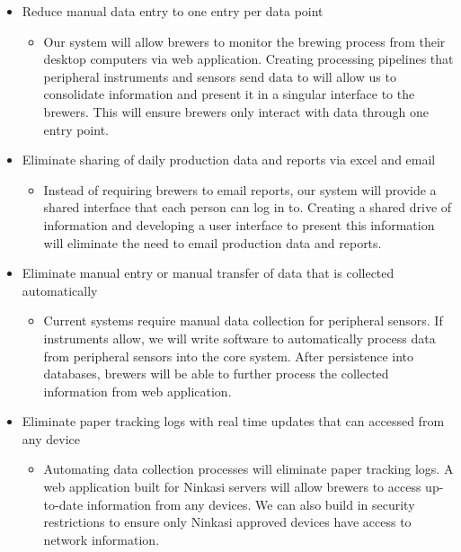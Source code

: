 \documentclass[draftclsnofoot,onecolumn,letterpaper,10pt]{IEEEtran}
\begin{document}
\begin{itemize}
\item {Reduce manual data entry to one entry per data point}
        \begin{itemize}
\item {Our system will allow brewers to monitor the brewing process from their desktop computers via web application. Creating processing pipelines that peripheral instruments and sensors send data to will allow us to consolidate information and present it in a singular interface to the brewers. This will ensure brewers only interact with data through one entry point.}
        \end{itemize}
\item {Eliminate sharing of daily production data and reports via excel and email}
        \begin{itemize}
\item {Instead of requiring brewers to email reports, our system will provide a shared interface that each person can log in to. Creating a shared drive of information and developing a user interface to present this information will eliminate the need to email production data and reports.}
        \end{itemize}
\item {Eliminate manual entry or manual transfer of data that is collected automatically}
        \begin{itemize}
\item {Current systems require manual data collection for peripheral sensors. If instruments allow, we will write software to automatically process data from peripheral sensors into the core system. After persistence into databases, brewers will be able to further process the collected information from web application.}
        \end{itemize}
\item {Eliminate paper tracking logs with real time updates that can accessed from any device}
        \begin{itemize}
\item {Automating data collection processes will eliminate paper tracking logs. A web application built for Ninkasi servers will allow brewers to access up-to-date information from any devices. We can also build in security restrictions to ensure only Ninkasi approved devices have access to network information.}
        \end{itemize}
\end{itemize}
\end{document}

